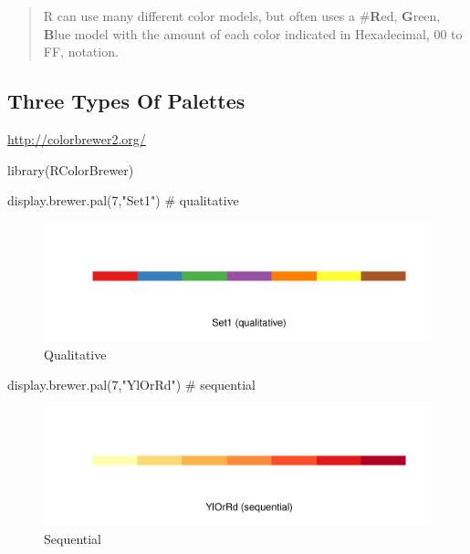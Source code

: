 \documentclass[
]{article}
\newenvironment{Shaded}{}{}
\newcommand{\CommentTok}[1]{\textcolor[rgb]{0.00,0.50,0.00}{#1}}
\newcommand{\DecValTok}[1]{#1}
\newcommand{\KeywordTok}[1]{\textcolor[rgb]{0.00,0.00,1.00}{#1}}
\newcommand{\NormalTok}[1]{#1}
\newcommand{\StringTok}[1]{\textcolor[rgb]{0.00,0.50,0.50}{#1}}
\begin{document}
\begin{quote}
R can use many different color models, but often uses a \#\textbf{R}ed,
\textbf{G}reen, \textbf{B}lue model with the amount of each color
indicated in Hexadecimal, 00 to FF, notation.
\end{quote}

\hypertarget{three-types-of-palettes}{%
\subsection{Three Types Of Palettes}\label{three-types-of-palettes}}

\url{http://colorbrewer2.org/}

\begin{Shaded}
\begin{Highlighting}[]
\KeywordTok{library}\NormalTok{(RColorBrewer)}
\end{Highlighting}
\end{Shaded}

\begin{Shaded}
\begin{Highlighting}[]
\KeywordTok{display.brewer.pal}\NormalTok{(}\DecValTok{7}\NormalTok{,}\StringTok{"Set1"}\NormalTok{) }\CommentTok{# qualitative}
\end{Highlighting}
\end{Shaded}

\begin{figure}
\centering
\includegraphics{design_files/figure-latex/unnamed-chunk-4-1.pdf}
\caption{Qualitative}
\end{figure}

\begin{Shaded}
\begin{Highlighting}[]
\KeywordTok{display.brewer.pal}\NormalTok{(}\DecValTok{7}\NormalTok{,}\StringTok{"YlOrRd"}\NormalTok{) }\CommentTok{# sequential}
\end{Highlighting}
\end{Shaded}

\begin{figure}
\centering
\includegraphics{design_files/figure-latex/unnamed-chunk-5-1.pdf}
\caption{Sequential}
\end{figure}
\end{document}
